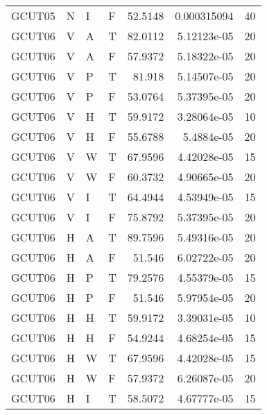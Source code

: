 \begin{longtable}{llllrrr}
    GCUT05   & N         & I         & F          & 52.5148    & 0.000315094 & 40       \\
    GCUT06   & V         & A         & T          & 82.0112    & 5.12123e-05 & 20       \\
    GCUT06   & V         & A         & F          & 57.9372    & 5.18322e-05 & 20       \\
    GCUT06   & V         & P         & T          & 81.918     & 5.14507e-05 & 20       \\
    GCUT06   & V         & P         & F          & 53.0764    & 5.37395e-05 & 20       \\
    GCUT06   & V         & H         & T          & 59.9172    & 3.28064e-05 & 10       \\
    GCUT06   & V         & H         & F          & 55.6788    & 5.4884e-05  & 20       \\
    GCUT06   & V         & W         & T          & 67.9596    & 4.42028e-05 & 15       \\
    GCUT06   & V         & W         & F          & 60.3732    & 4.90665e-05 & 20       \\
    GCUT06   & V         & I         & T          & 64.4944    & 4.53949e-05 & 15       \\
    GCUT06   & V         & I         & F          & 75.8792    & 5.37395e-05 & 20       \\
    GCUT06   & H         & A         & T          & 89.7596    & 5.49316e-05 & 20       \\
    GCUT06   & H         & A         & F          & 51.546     & 6.02722e-05 & 20       \\
    GCUT06   & H         & P         & T          & 79.2576    & 4.55379e-05 & 15       \\
    GCUT06   & H         & P         & F          & 51.546     & 5.97954e-05 & 20       \\
    GCUT06   & H         & H         & T          & 59.9172    & 3.39031e-05 & 10       \\
    GCUT06   & H         & H         & F          & 54.9244    & 4.68254e-05 & 15       \\
    GCUT06   & H         & W         & T          & 67.9596    & 4.42028e-05 & 15       \\
    GCUT06   & H         & W         & F          & 57.9372    & 6.26087e-05 & 20       \\
    GCUT06   & H         & I         & T          & 58.5072    & 4.67777e-05 & 15       \\

\end{longtable}
